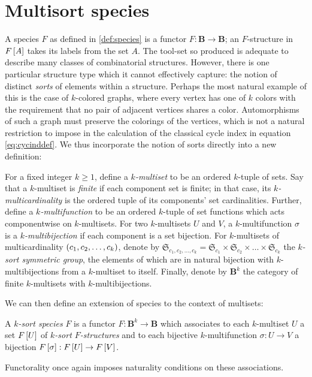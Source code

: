 \documentclass[sectionflow,singlespace,twoside,boldmathhdr]{brandiss} %
\numberwithin{section}{chapter}
\numberwithin{figure}{chapter}
\begin{document}
\section{Multisort species}\label{s:mult}
A species $F$ as defined in \ref{def:species} is a functor $F: \mathbf{B} \to \mathbf{B}$; an $F$-structure in $F \left[ {A} \right]$ takes its labels from the set $A$.
The tool-set so produced is adequate to describe many classes of combinatorial structures.
However, there is one particular structure type which it cannot effectively capture: the notion of distinct \emph{sorts} of elements within a structure.
Perhaps the most natural example of this is the case of $k$-colored graphs, where every vertex has one of $k$ colors with the requirement that no pair of adjacent vertices shares a color.
Automorphisms of such a graph must preserve the colorings of the vertices, which is not a natural restriction to impose in the calculation of the classical cycle index in equation \eqref{eq:cycinddef}.
We thus incorporate the notion of sorts directly into a new definition:
\begin{definition} 
  \label{def:multiset}
  For a fixed integer $k \geq 1$, define a \emph{$k$-multiset} to be an ordered $k$-tuple of sets.
  Say that a $k$-multiset is \emph{finite} if each component set is finite; in that case, its \emph{$k$-multicardinality} is the ordered tuple of its components' set cardinalities.
  Further, define a \emph{$k$-multifunction} to be an ordered $k$-tuple of set functions which acts componentwise on $k$-multisets.
  For two $k$-multisets $U$ and $V$, a $k$-multifunction $\sigma$ is a \emph{$k$-multibijection} if each component is a set bijection.
  For $k$-multisets of multicardinality $\left( {c_{1}, c_{2}, \dots, c_{k}} \right)$, denote by $\mathfrak{S}_{c_{1}, c_{2}, \dots, c_{k}} = \mathfrak{S}_{c_{1}} \times \mathfrak{S}_{c_{2}} \times \dots \times \mathfrak{S}_{c_{k}}$ the \emph{$k$-sort symmetric group}, the elements of which are in natural bijection with $k$-multibijections from a $k$-multiset to itself.
  Finally, denote by $\mathbf{B}^{k}$ the category of finite $k$-multisets with $k$-multibijections.
\end{definition}

We can then define an extension of species to the context of multisets:
\begin{definition}
  \label{def:multisort}
  A \emph{$k$-sort species} $F$ is a functor $F: \mathbf{B}^{k} \to \mathbf{B}$ which associates to each $k$-multiset $U$ a set $F \left[ {U} \right]$ of \emph{$k$-sort $F$-structures} and to each bijective $k$-multifunction $\sigma: U \to V$ a bijection $F \left[ {\sigma} \right]: F \left[ {U} \right] \to F \left[ {V} \right]$.
\end{definition}
Functorality once again imposes naturality conditions on these associations.
\end{document}
